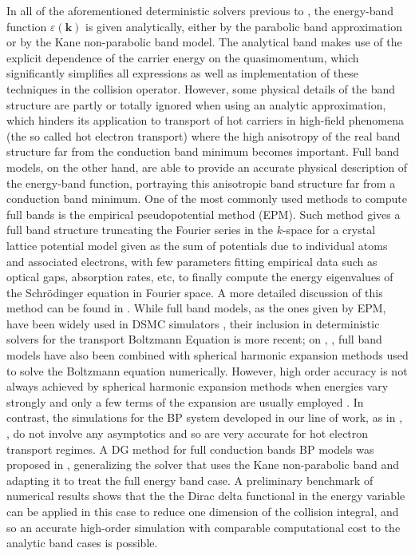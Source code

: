 \documentclass[11pt]{article}
\newcommand{\bk}{\mathbf{k}}
\newcommand{\eps}{\varepsilon}
\newcommand{\enk}{\eps(\bk)}
\begin{document}
In all of the aforementioned deterministic solvers previous to \cite{CGMS-IWCE13}, the energy-band  function $\enk$  is given analytically, either by  the parabolic band approximation or by the Kane non-parabolic band model. 
The analytical band makes use of the explicit dependence of 
the carrier energy on the quasimomentum, which significantly simplifies all expressions as well as 
implementation of these techniques in the collision operator. However, some physical details of the 
band structure are partly or totally ignored when using an analytic approximation, which hinders its 
 application to transport of hot carriers in high-field phenomena (the so called hot electron 
transport) where the high anisotropy of the real band structure far from the conduction band minimum 
becomes important. Full band models, on the other hand, are able to provide an accurate physical 
description of the energy-band function, portraying this anisotropic band structure far from a 
conduction band minimum. 
One of the most commonly used methods to compute 
full bands is the 
empirical pseudopotential method (EPM). Such method gives a full 
band structure truncating the Fourier 
series in the $k$-space \cite{paperCHLKW} for a crystal lattice potential model given as the sum of 
potentials due to individual atoms and associated electrons, with few parameters fitting empirical 
data such as optical gaps, absorption rates, etc, to finally compute the energy eigenvalues of the 
Schr\"{o}dinger equation in 
Fourier space. A more detailed discussion of this method can be found in 
\cite{paperCHLKW, COHEN-CHLKW}. 
While full band models, as the ones given by EPM, have been widely 
used in DSMC simulators \cite{jaco89}, their inclusion in deterministic solvers for the transport Boltzmann Equation is more recent; on \cite{Smirnov_06_JAP_Fullband}, \cite{FBvalence}, full band models have also been combined with spherical harmonic expansion methods used to solve the Boltzmann equation numerically. However, high order accuracy is not always achieved by spherical harmonic expansion methods 
when energies vary strongly
and only a few terms of the expansion are usually employed \cite{Majorana_2002}. In contrast, the simulations for the BP system  developed in our line of work, as in 
\cite{chgms-sispad07}, \cite{CGMS-CMAME2008}, do not involve any asymptotics
and so are very accurate for hot electron transport regimes.
A DG method for full conduction bands BP models was proposed 
in \cite{CGMS-IWCE13},
generalizing the solver that uses the Kane non-parabolic band and adapting it to treat the full energy band case. A preliminary benchmark of numerical results shows that the the Dirac delta functional in the energy variable can be applied in this case to reduce one dimension of the collision integral, and so an accurate high-order simulation with comparable computational cost to the analytic band 
cases is possible. 
\end{document}
